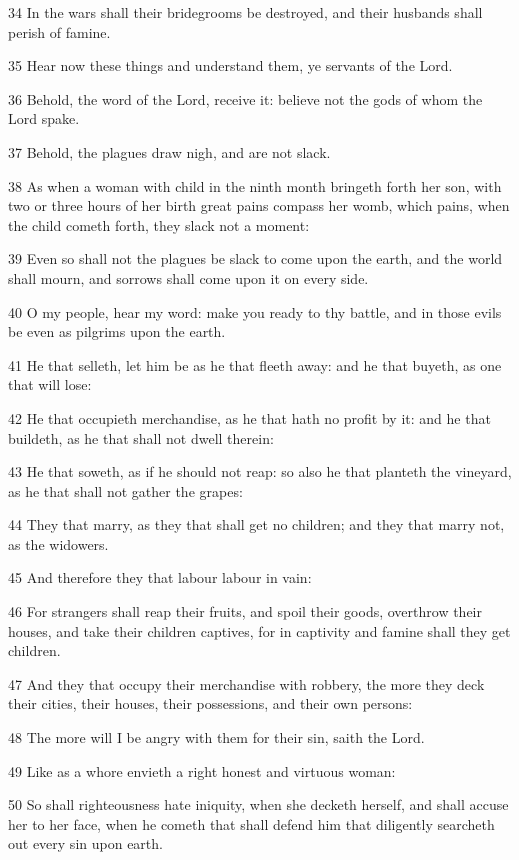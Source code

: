 \par 34 In the wars shall their bridegrooms be destroyed, and their husbands shall perish of famine.
\par 35 Hear now these things and understand them, ye servants of the Lord.
\par 36 Behold, the word of the Lord, receive it: believe not the gods of whom the Lord spake.
\par 37 Behold, the plagues draw nigh, and are not slack.
\par 38 As when a woman with child in the ninth month bringeth forth her son, with two or three hours of her birth great pains compass her womb, which pains, when the child cometh forth, they slack not a moment:
\par 39 Even so shall not the plagues be slack to come upon the earth, and the world shall mourn, and sorrows shall come upon it on every side.
\par 40 O my people, hear my word: make you ready to thy battle, and in those evils be even as pilgrims upon the earth.
\par 41 He that selleth, let him be as he that fleeth away: and he that buyeth, as one that will lose:
\par 42 He that occupieth merchandise, as he that hath no profit by it: and he that buildeth, as he that shall not dwell therein:
\par 43 He that soweth, as if he should not reap: so also he that planteth the vineyard, as he that shall not gather the grapes:
\par 44 They that marry, as they that shall get no children; and they that marry not, as the widowers.
\par 45 And therefore they that labour labour in vain:
\par 46 For strangers shall reap their fruits, and spoil their goods, overthrow their houses, and take their children captives, for in captivity and famine shall they get children.
\par 47 And they that occupy their merchandise with robbery, the more they deck their cities, their houses, their possessions, and their own persons:
\par 48 The more will I be angry with them for their sin, saith the Lord.
\par 49 Like as a whore envieth a right honest and virtuous woman:
\par 50 So shall righteousness hate iniquity, when she decketh herself, and shall accuse her to her face, when he cometh that shall defend him that diligently searcheth out every sin upon earth.
